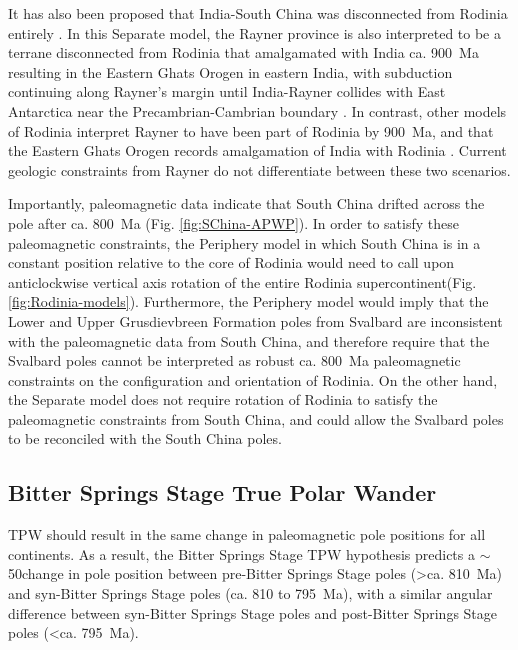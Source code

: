 It has also been proposed that India-South China was disconnected from Rodinia entirely \citep{Merdith2017a}. In this Separate model, the Rayner province is also interpreted to be a terrane disconnected from Rodinia that amalgamated with India ca. 900~Ma resulting in the Eastern Ghats Orogen in eastern India, with subduction continuing along Rayner's margin until India-Rayner collides with East Antarctica near the Precambrian-Cambrian boundary \citep{Merdith2017a}. In contrast, other models of Rodinia interpret Rayner to have been part of Rodinia by 900~Ma, and that the Eastern Ghats Orogen records amalgamation of India with Rodinia \citep{Li2008a}. Current geologic constraints from Rayner do not differentiate between these two scenarios.

Importantly, paleomagnetic data indicate that South China drifted across the pole after ca. 800~Ma (Fig. \ref{fig:SChina-APWP}). In order to satisfy these paleomagnetic constraints, the Periphery model in which South China is in a constant position relative to the core of Rodinia would need to call upon anticlockwise vertical axis rotation of the entire Rodinia supercontinent(Fig. \ref{fig:Rodinia-models}). Furthermore, the Periphery model would imply that the Lower and Upper Grusdievbreen Formation poles from Svalbard are inconsistent with the paleomagnetic data from South China, and therefore require that the Svalbard poles cannot be interpreted as robust ca. 800~Ma paleomagnetic constraints on the configuration and orientation of Rodinia. On the other hand, the Separate model does not require rotation of Rodinia to satisfy the paleomagnetic constraints from South China, and could allow the Svalbard poles to be reconciled with the South China poles.

\subsection{Bitter Springs Stage True Polar Wander}

TPW should result in the same change in paleomagnetic pole positions for all continents. As a result, the Bitter Springs Stage TPW hypothesis predicts a $\sim$50\degrees change in pole position between pre-Bitter Springs Stage poles (\textgreater ca. 810~Ma) and syn-Bitter Springs Stage poles (ca. 810 to 795~Ma), with a similar angular difference between syn-Bitter Springs Stage poles and post-Bitter Springs Stage poles (\textless ca. 795~Ma).


